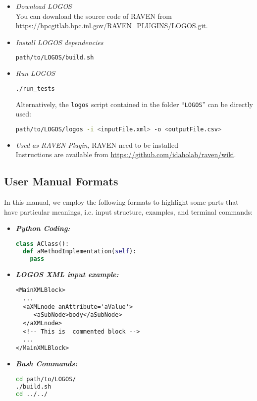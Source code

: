 \begin{itemize}
  \item \textit{Download LOGOS}
    \\ You can download the source code of RAVEN from \url{https://hpcgitlab.hpc.inl.gov/RAVEN_PLUGINS/LOGOS.git}.
  \item \textit{Install LOGOS dependencies}
	\begin{lstlisting}[language=bash]
	path/to/LOGOS/build.sh
	\end{lstlisting}
  \item \textit{Run LOGOS}
	\begin{lstlisting}[language=bash]
	./run_tests
	\end{lstlisting}
  	Alternatively, the \texttt{logos} script
    contained in the folder ``\texttt{LOGOS}'' can be directly used:
\begin{lstlisting}[language=bash]
path/to/LOGOS/logos -i <inputFile.xml> -o <outputFile.csv>
\end{lstlisting}
	\item \textit{Used as RAVEN Plugin}, RAVEN need to be installed
		\\ Instructions are available from \url{https://github.com/idaholab/raven/wiki}.
\end{itemize}

\subsection{User Manual Formats}
In this manual, we employ the following formats to highlight some parts that have
particular meanings, i.e. input structure, examples, and terminal commands:

\begin{itemize}
\item \textbf{\textit{Python Coding:}}
\begin{lstlisting}[language=python]
class AClass():
  def aMethodImplementation(self):
    pass
\end{lstlisting}
\item \textbf{\textit{LOGOS XML input example:}}
\begin{lstlisting}[style=XML,morekeywords={anAttribute}]
<MainXMLBlock>
  ...
  <aXMLnode anAttribute='aValue'>
     <aSubNode>body</aSubNode>
  </aXMLnode>
  <!-- This is  commented block -->
  ...
</MainXMLBlock>
\end{lstlisting}
\item \textbf{\textit{Bash Commands:}}
\begin{lstlisting}[language=bash]
cd path/to/LOGOS/
./build.sh
cd ../../
\end{lstlisting}
\end{itemize}

